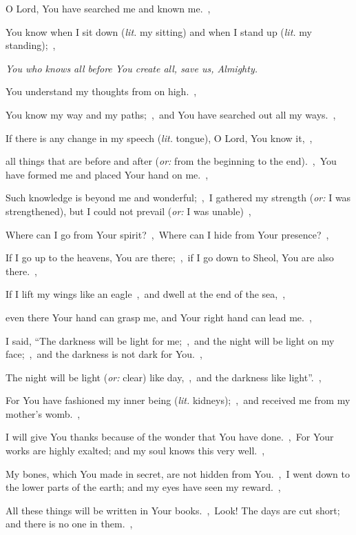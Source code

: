 \documentclass[12pt,twoside,a5paper]{article}
\newcommand{\qanona}[1]{{\liturgicalhint{Qanona.} \emph{#1}}}
\newcommand{\translationoption}[1]{\emph{or:} #1}
\newcommand{\translationliteral}[1]{\emph{lit.} #1}
\begin{document}
\begin{normalparskip}
  O Lord, You have searched me and known me.~\sep

  You know when I sit down (\translationliteral{my sitting}) and when I stand up (\translationliteral{my standing});~\sep

  \qanona{You who knows all before You create all, save us, Almighty.}

  You understand my thoughts from on high.~\sep

  You know my way and my paths;~\sep\ and You have searched out all my ways.~\sep

  If there is any change in my speech (\translationliteral{tongue}), O Lord, You know it,~\sep

  all things that are before and after (\translationoption{from the beginning to the end}).~\sep\ You have formed me and placed Your hand on me.~\sep

  Such knowledge is beyond me and wonderful;~\sep\ I gathered my strength (\translationoption{I was strengthened}), but I could not prevail (\translationoption{I was unable})~\sep

  Where can I go from Your spirit?~\sep\ Where can I hide from Your presence?~\sep

  If I go up to the heavens, You are there;~\sep\ if I go down to Sheol, You are also there.~\sep

  If I lift my wings like an eagle~\sep\ and dwell at the end of the sea,~\sep

  even there Your hand can grasp me, and Your right hand can lead me.~\sep

  I said, ``The darkness will be light for me;~\sep\ and the night will be light on my face;~\sep\ and the darkness is not dark for You.~\sep

  The night will be light (\translationoption{clear}) like day,~\sep\ and the darkness like light''.~\sep

  For You have fashioned my inner being (\translationliteral{kidneys});~\sep\ and received me from my mother's womb.~\sep

  I will give You thanks because of the wonder that You have done.~\sep\ For Your works are highly exalted; and my soul knows this very well.~\sep

  My bones, which You made in secret, are not hidden from You.~\sep\ I went down to the lower parts of the earth; and my eyes have seen my reward.~\sep

  All these things will be written in Your books.~\sep\ Look! The days are cut short; and there is no one in them.~\sep


\end{normalparskip}
\end{document}
